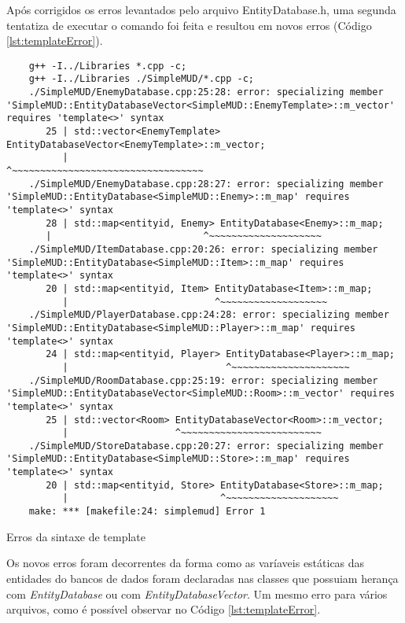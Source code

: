 Após corrigidos os erros levantados pelo arquivo EntityDatabase.h, uma segunda tentatiza de 
executar o comando foi feita e resultou em novos erros (Código \ref{lst:templateError}).

\begin{listing}[!ht]
    \begin{verbatim}
    g++ -I../Libraries *.cpp -c;
    g++ -I../Libraries ./SimpleMUD/*.cpp -c;
    ./SimpleMUD/EnemyDatabase.cpp:25:28: error: specializing member 'SimpleMUD::EntityDatabaseVector<SimpleMUD::EnemyTemplate>::m_vector' requires 'template<>' syntax
       25 | std::vector<EnemyTemplate> EntityDatabaseVector<EnemyTemplate>::m_vector;
          |                            ^~~~~~~~~~~~~~~~~~~~~~~~~~~~~~~~~~~
    ./SimpleMUD/EnemyDatabase.cpp:28:27: error: specializing member 'SimpleMUD::EntityDatabase<SimpleMUD::Enemy>::m_map' requires 'template<>' syntax
       28 | std::map<entityid, Enemy> EntityDatabase<Enemy>::m_map;
       |                           ^~~~~~~~~~~~~~~~~~~~~
    ./SimpleMUD/ItemDatabase.cpp:20:26: error: specializing member 'SimpleMUD::EntityDatabase<SimpleMUD::Item>::m_map' requires 'template<>' syntax
       20 | std::map<entityid, Item> EntityDatabase<Item>::m_map;
          |                          ^~~~~~~~~~~~~~~~~~~~
    ./SimpleMUD/PlayerDatabase.cpp:24:28: error: specializing member 'SimpleMUD::EntityDatabase<SimpleMUD::Player>::m_map' requires 'template<>' syntax
       24 | std::map<entityid, Player> EntityDatabase<Player>::m_map;
          |                            ^~~~~~~~~~~~~~~~~~~~~~
    ./SimpleMUD/RoomDatabase.cpp:25:19: error: specializing member 'SimpleMUD::EntityDatabaseVector<SimpleMUD::Room>::m_vector' requires 'template<>' syntax
       25 | std::vector<Room> EntityDatabaseVector<Room>::m_vector;
          |                   ^~~~~~~~~~~~~~~~~~~~~~~~~~
    ./SimpleMUD/StoreDatabase.cpp:20:27: error: specializing member 'SimpleMUD::EntityDatabase<SimpleMUD::Store>::m_map' requires 'template<>' syntax
       20 | std::map<entityid, Store> EntityDatabase<Store>::m_map;
          |                           ^~~~~~~~~~~~~~~~~~~~~
    make: *** [makefile:24: simplemud] Error 1
    \end{verbatim}
\caption{Erros da sintaxe de template}
\label{lst:templateError}
\end{listing}

Os novos erros foram decorrentes da forma como as varíaveis estáticas das entidades do bancos de dados
foram declaradas nas classes que possuiam herança com \textit{EntityDatabase} ou com \textit{EntityDatabaseVector}. 
Um mesmo erro para vários arquivos, como é possível observar no Código \ref{lst:templateError}. 

